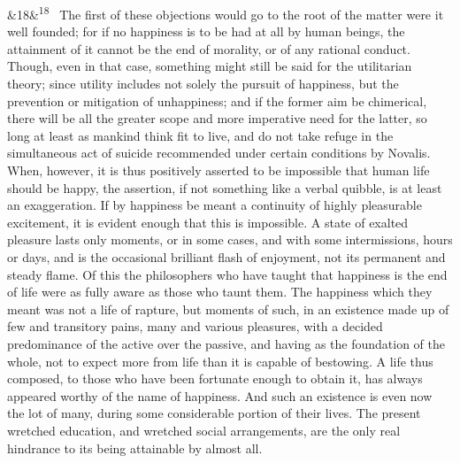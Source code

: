 \documentclass[12pt]{article}
\newcommand{\para}[1][]{\par\noindent\ifx&#1&\else\textsuperscript{\footnotesize #1}~\fi}
\begin{document}
\para[18] The first of these objections would go to the root of the matter were it well founded; for if no happiness is to be had at all by human beings, the attainment of it cannot be the end of morality, or of any rational conduct. Though, even in that case, something might still be said for the utilitarian theory; since utility includes not solely the pursuit of happiness, but the prevention or mitigation of unhappiness; and if the former aim be chimerical, there will be all the greater scope and more imperative need for the latter, so long at least as mankind think fit to live, and do not take refuge in the simultaneous act of suicide recommended under certain conditions by Novalis. When, however, it is thus positively asserted to be impossible that human life should be happy, the assertion, if not something like a verbal quibble, is at least an exaggeration. If by happiness be meant a continuity of highly pleasurable excitement, it is evident enough that this is impossible. A state of exalted pleasure lasts only moments, or in some cases, and with some intermissions, hours or days, and is the occasional brilliant flash of enjoyment, not its permanent and steady flame. Of this the philosophers who have taught that happiness is the end of life were as fully aware as those who taunt them. The happiness which they meant was not a life of rapture, but moments of such, in an existence made up of few and transitory pains, many and various pleasures, with a decided predominance of the active over the passive, and having as the foundation of the whole, not to expect more from life than it is capable of bestowing. A life thus composed, to those who have been fortunate enough to obtain it, has always appeared worthy of the name of happiness. And such an existence is even now the lot of many, during some considerable portion of their lives. The present wretched education, and wretched social arrangements, are the only real hindrance to its being attainable by almost all.
\end{document}

